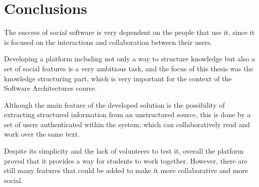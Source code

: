 \documentclass[conference]{IEEEtran}
\begin{document}
\section{Conclusions}
The success of social software is very dependent on the people that use it, since it is focused on the interactions and collaboration between their users.

Developing a platform including not only a way to structure knowledge but also a set of social features is a very ambitious task, and the focus of this thesis was the knowledge structuring part, which is very important for the context of the Software Architectures course.

Although the main feature of the developed solution is the possibility of extracting structured information from an unstructured source, this is done by a set of users authenticated within the system, which can collaboratively read and work over the same text.

Despite its simplicity and the lack of volunteers to test it, overall the platform proved that it provides a way for students to work together. However, there are still many features that could be added to make it more collaborative and more social.

  
  

\end{document}
